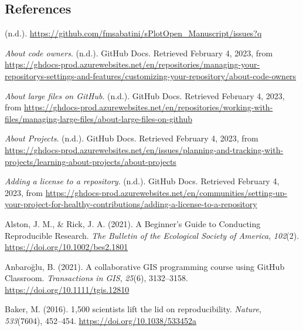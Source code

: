 \hypertarget{references}{%
\subsection{References}\label{references}}

\hypertarget{refs}{}
\begin{CSLReferences}{1}{0}
\leavevmode{}%
(n.d.). \url{https://github.com/fmsabatini/sPlotOpen_Manuscript/issues?q}

\leavevmode{}%
\emph{About code owners}. (n.d.). GitHub Docs. Retrieved February 4, 2023, from \url{https://ghdocs-prod.azurewebsites.net/en/repositories/managing-your-repositorys-settings-and-features/customizing-your-repository/about-code-owners}

\leavevmode{}%
\emph{About large files on GitHub}. (n.d.). GitHub Docs. Retrieved February 4, 2023, from \url{https://ghdocs-prod.azurewebsites.net/en/repositories/working-with-files/managing-large-files/about-large-files-on-github}

\leavevmode{}%
\emph{About Projects}. (n.d.). GitHub Docs. Retrieved February 4, 2023, from \url{https://ghdocs-prod.azurewebsites.net/en/issues/planning-and-tracking-with-projects/learning-about-projects/about-projects}

\leavevmode{}%
\emph{Adding a license to a repository}. (n.d.). GitHub Docs. Retrieved February 4, 2023, from \url{https://ghdocs-prod.azurewebsites.net/en/communities/setting-up-your-project-for-healthy-contributions/adding-a-license-to-a-repository}

\leavevmode{}%
Alston, J. M., \& Rick, J. A. (2021). A Beginner's Guide to Conducting Reproducible Research. \emph{The Bulletin of the Ecological Society of America}, \emph{102}(2). \url{https://doi.org/10.1002/bes2.1801}

\leavevmode{}%
Anbaroğlu, B. (2021). A collaborative GIS programming course using GitHub Classroom. \emph{Transactions in GIS}, \emph{25}(6), 3132--3158. \url{https://doi.org/10.1111/tgis.12810}

\leavevmode{}%
Baker, M. (2016). 1,500 scientists lift the lid on reproducibility. \emph{Nature}, \emph{533}(7604), 452--454. \url{https://doi.org/10.1038/533452a}


\end{CSLReferences}
